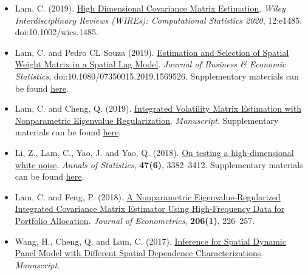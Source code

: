 \documentclass[overlapped,line,letterpaper]{res}
\begin{document}
\begin{resume}
\begin{itemize}
\item[$\bullet$] Lam, C. (2019). \href{https://cliffordlam.github.io/files/HDCovSpecR2.pdf}{High Dimensional Covariance Matrix Estimation}. {\em Wiley Interdisciplinary Reviews (WIREs): Computational Statistics 2020}, 12:e1485. doi:10.1002/wics.1485.

 \vspace{12pt}

\item[$\bullet$] Lam, C. and Pedro CL Souza (2019). \href{https://cliffordlam.github.io/files/SpEstSel.pdf}{Estimation and Selection of Spatial Weight Matrix in a Spatial Lag Model}. {\em Journal of Business \& Economic Statistics}, doi:10.1080/07350015.2019.1569526. Supplementary materials can be found \href{https://cliffordlam.github.io/files/Supp-SpEstSel.pdf}{here}.

 \vspace{12pt}

\item[$\bullet$] Lam, C. and Cheng, Q. (2019). \href{https://cliffordlam.github.io/files/LICOVcomp4.pdf}{Integrated Volatility Matrix Estimation with
Nonparametric Eigenvalue Regularization}. {\em Manuscript}. Supplementary materials can be found  \href{https://cliffordlam.github.io/files/Supp-LICOVcomp.pdf}{here}.

 \vspace{12pt}

\item[$\bullet$] Li, Z., Lam, C., Yao, J. and Yao, Q. (2018). \href{https://cliffordlam.github.io/files/wn11-main.pdf}{On testing a high-dimensional white noise}. {\em Annals of Statistics}, {\bf 47(6)}, 3382--3412. Supplementary materials can be found \href{https://cliffordlam.github.io/files/wn11-supplementary.pdf}{here}.

 \vspace{12pt}

\item[$\bullet$] Lam, C. and Feng, P. (2018). \href{https://cliffordlam.github.io/files/NERIVE4-2.pdf}{A Nonparametric Eigenvalue-Regularized Integrated Covariance Matrix Estimator Using High-Frequency Data for Portfolio Allocation}. {\em Journal of Econometrics}, {\bf 206(1)}, 226--257.
\vspace{12pt}

\item[$\bullet$] Wang, H., Cheng, Q. and Lam, C. (2017).
    \href{https://cliffordlam.github.io/files/QMLEspatial.pdf}{Inference for Spatial Dynamic Panel Model with Different Spatial Dependence Characterizations}. {\em Manuscript}.
\vspace{12pt}


\end{itemize}
\end{resume}
\end{document}
